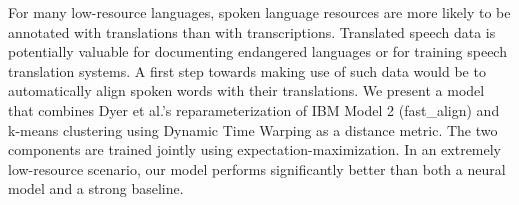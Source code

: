 For many low-resource languages, spoken language resources are more likely to be annotated with translations than with transcriptions. Translated speech data is potentially valuable for documenting endangered languages or for training speech translation systems. A first step towards making use of such data would be to automatically align spoken words with their translations. We present a model that combines Dyer et al.'s reparameterization of IBM Model 2 (fast\_align) and k-means clustering using Dynamic Time Warping as a distance metric. The two components are trained jointly using expectation-maximization. In an extremely low-resource scenario, our model performs significantly better than both a neural model and a strong baseline.
